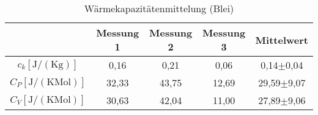 \begin{table}[h]
 	\begin{center}
		\begin{tabular}{c|cccc}
			&Messung 1&Messung 2&Messung 3&Mittelwert \\ \hline
			$c_k [\text{J}/(\text{K} \text{g})]$&0,16&0,21&0,06&0,14$\pm$0,04\\
			$C_P [\text{J}/(\text{K} \text{Mol})]$&32,33&43,75&12,69&29,59$\pm$9,07\\
			$C_V [\text{J}/(\text{K} \text{Mol})]$&30,63&42,04&11,00&27,89$\pm$9,06
		\end{tabular}
		\caption{Wärmekapazitätenmittelung (Blei)}
		\label{tabdiss2}
	\end{center}
\end{table}